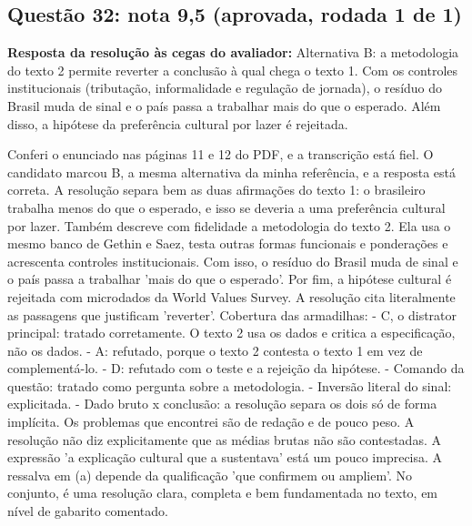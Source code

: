 \documentclass{article}%
\begin{document}
\subsection*{Questão 32: nota 9,5 (aprovada, rodada 1 de 1)}%
\textbf{Resposta da resolução às cegas do avaliador:} Alternativa B: a metodologia do texto 2 permite reverter a conclusão à qual chega o texto 1. Com os controles institucionais (tributação, informalidade e regulação de jornada), o resíduo do Brasil muda de sinal e o país passa a trabalhar mais do que o esperado. Além disso, a hipótese da preferência cultural por lazer é rejeitada.\par %
Conferi o enunciado nas páginas 11 e 12 do PDF, e a transcrição está fiel. O candidato marcou B, a mesma alternativa da minha referência, e a resposta está correta. A resolução separa bem as duas afirmações do texto 1: o brasileiro trabalha menos do que o esperado, e isso se deveria a uma preferência cultural por lazer. Também descreve com fidelidade a metodologia do texto 2. Ela usa o mesmo banco de Gethin e Saez, testa outras formas funcionais e ponderações e acrescenta controles institucionais. Com isso, o resíduo do Brasil muda de sinal e o país passa a trabalhar 'mais do que o esperado'. Por fim, a hipótese cultural é rejeitada com microdados da World Values Survey. A resolução cita literalmente as passagens que justificam 'reverter'.\newline%
\newline%
Cobertura das armadilhas:\newline%
{-} C, o distrator principal: tratado corretamente. O texto 2 usa os dados e critica a especificação, não os dados.\newline%
{-} A: refutado, porque o texto 2 contesta o texto 1 em vez de complementá{-}lo.\newline%
{-} D: refutado com o teste e a rejeição da hipótese.\newline%
{-} Comando da questão: tratado como pergunta sobre a metodologia.\newline%
{-} Inversão literal do sinal: explicitada.\newline%
{-} Dado bruto x conclusão: a resolução separa os dois só de forma implícita.\newline%
\newline%
Os problemas que encontrei são de redação e de pouco peso. A resolução não diz explicitamente que as médias brutas não são contestadas. A expressão 'a explicação cultural que a sustentava' está um pouco imprecisa. A ressalva em (a) depende da qualificação 'que confirmem ou ampliem'. No conjunto, é uma resolução clara, completa e bem fundamentada no texto, em nível de gabarito comentado.%
\end{document}
